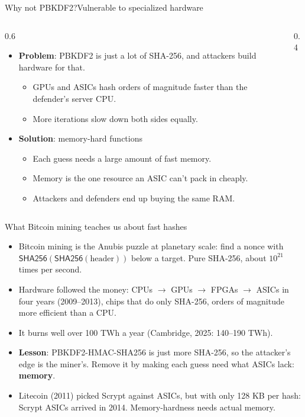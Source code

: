 \ifdefined\PRESENTATION\else\PassOptionsToClass{handout}{beamer}\fi\documentclass[aspectratio=169, lualatex]{beamer}
\begin{document}
\begin{frame}{Why not PBKDF2?}{Vulnerable to specialized hardware}
	\begin{columns}[c]
		\begin{column}{0.6\textwidth}
			\begin{itemize}
				\item \textbf{Problem}: PBKDF2 is just a lot of SHA-256, and attackers build hardware for that.
				      \begin{itemize}
					      \item GPUs and ASICs hash orders of magnitude faster than the defender's server CPU.
					      \item More iterations slow down both sides equally.
				      \end{itemize}
				\item \textbf{Solution}: memory-hard functions
				      \begin{itemize}
					      \item Each guess needs a large amount of fast memory.
					      \item Memory is the one resource an ASIC can't pack in cheaply.
					      \item Attackers and defenders end up buying the same RAM.
				      \end{itemize}
			\end{itemize}
		\end{column}
		\begin{column}{0.4\textwidth}
		\end{column}
	\end{columns}
\end{frame}

\begin{frame}{What Bitcoin mining teaches us about fast hashes}
	\begin{itemize}
		\item Bitcoin mining is the Anubis puzzle at planetary scale: find a nonce with $\mathsf{SHA256}(\mathsf{SHA256}(\text{header}))$ below a target. Pure SHA-256, about $10^{21}$ times per second.
		\item Hardware followed the money: CPUs $\rightarrow$ GPUs $\rightarrow$ FPGAs $\rightarrow$ ASICs in four years (2009--2013), chips that do only SHA-256, orders of magnitude more efficient than a CPU.
		\item It burns well over 100 TWh a year (Cambridge, 2025: 140--190 TWh).
		\item \textbf{Lesson}: PBKDF2-HMAC-SHA256 is just more SHA-256, so the attacker's edge is the miner's. Remove it by making each guess need what ASICs lack: \textbf{memory}.
		\item Litecoin (2011) picked Scrypt against ASICs, but with only 128 KB per hash: Scrypt ASICs arrived in 2014. Memory-hardness needs actual memory.
	\end{itemize}
\end{frame}
\end{document}
